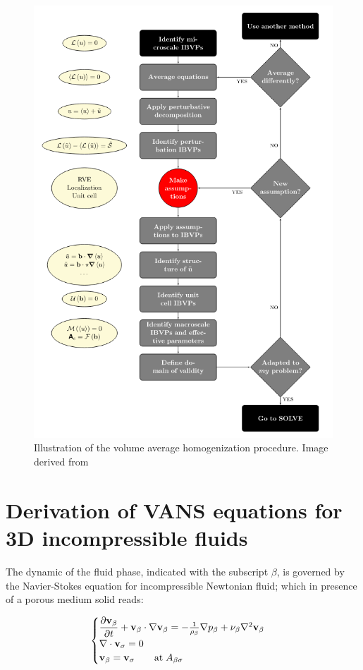 \begin{figure}[h!]
	\centering
	\includegraphics[width=0.8\linewidth]{chapter_2/figure/schema_vans_homo}
	\caption{Illustration of the volume average homogenization procedure. Image derived from \citet{davit2013homogenization}}
	\label{fig:schema_vans_homo}
\end{figure}

\section{Derivation of VANS equations for 3D incompressible fluids}
The dynamic of the fluid phase, indicated with the subscript $\beta$, is governed by the Navier-Stokes equation for incompressible Newtonian fluid; which in presence of a porous medium solid reads:

\begin{eqnarray}
	\begin{cases}
		\dfrac{\partial \textbf{v}_{\beta}}{\partial t} + \textbf{v}_{\beta} \cdot \nabla \textbf{v}_{\beta} = -\frac{1}{\rho_{\beta}} \nabla p_{\beta} + \nu_{\beta} \nabla^2  \textbf{v}_{\beta}  \\
		\nabla \cdot \textbf{v}_{\sigma} = 0 \\
		\textbf{v}_{\beta} = \textbf{v}_{\sigma} \qquad \text{at} \; A_{\beta\sigma}
	\end{cases}
\label{eq:NS}
\end{eqnarray}\\

